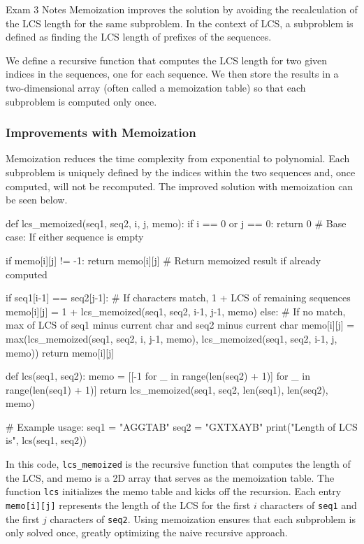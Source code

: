 \begin{examnotes}{Exam 3 Notes}
    Memoization improves the solution by avoiding the recalculation of the LCS length for the same subproblem. In the context of LCS, a subproblem is defined as finding the LCS length of prefixes of 
    the sequences.

    We define a recursive function that computes the LCS length for two given indices in the sequences, one for each sequence. We then store the results in a two-dimensional array (often called a 
    memoization table) so that each subproblem is computed only once.

    \begin{highlight}
        \subsubsection*{Improvements with Memoization}

        Memoization reduces the time complexity from exponential to polynomial. Each subproblem is uniquely defined by the indices within the two sequences and, once computed, will not be recomputed.
        The improved solution with memoization can be seen below.

    \begin{code}[Python]
    def lcs_memoized(seq1, seq2, i, j, memo):
        if i == 0 or j == 0:
            return 0  # Base case: If either sequence is empty
        
        if memo[i][j] != -1:
            return memo[i][j]  # Return memoized result if already computed
    
        if seq1[i-1] == seq2[j-1]:
            # If characters match, 1 + LCS of remaining sequences
            memo[i][j] = 1 + lcs_memoized(seq1, seq2, i-1, j-1, memo)
        else:
            # If no match, max of LCS of seq1 minus current char and seq2 minus current char
            memo[i][j] = max(lcs_memoized(seq1, seq2, i, j-1, memo), lcs_memoized(seq1, seq2, i-1, j, memo))
        return memo[i][j]
    
    def lcs(seq1, seq2):
        memo = [[-1 for _ in range(len(seq2) + 1)] for _ in range(len(seq1) + 1)]
        return lcs_memoized(seq1, seq2, len(seq1), len(seq2), memo)
    
    # Example usage:
    seq1 = "AGGTAB"
    seq2 = "GXTXAYB"
    print("Length of LCS is", lcs(seq1, seq2))
    \end{code}
        In this code, \texttt{lcs\_memoized} is the recursive function that computes the length of the LCS, and memo is a 2D array that serves as the memoization table. The function \texttt{lcs} 
        initializes the memo table and kicks off the recursion. Each entry \texttt{memo[i][j]} represents the length of the LCS for the first $i$ characters of \texttt{seq1} and the first $j$ 
        characters of \texttt{seq2}. Using memoization ensures that each subproblem is only solved once, greatly optimizing the naive recursive approach. \vspace*{1em}


\end{highlight}
\end{examnotes}
